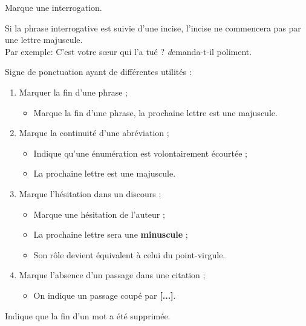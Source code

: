 \documentclass[10pt, french]{article}
\begin{document}
\begin{multicols*}{2}
\begin{definitionNOHFILLprop}
Marque une interrogation.

\begin{astuces}
Si la phrase interrogative est suivie d'une incise, l'incise ne commencera pas par une lettre majuscule.	\\

Par exemple: C'est votre sœur qui l'a tué ? \textit{d}emanda-t-il poliment.
\end{astuces}
\end{definitionNOHFILLprop}

\begin{definitionNOHFILLprop}
Signe de ponctuation ayant de différentes utilités : 
\begin{enumerate}
	\item	Marquer la fin d'une phrase ; 
		\begin{itemize}
		\item	Marque la fin d'une phrase, la prochaine lettre est une majuscule.
		\end{itemize}
	\item	Marque la continuité d'une abréviation ;
		\begin{itemize}
		\item	Indique qu'une énumération est volontairement écourtée ;
		\item	La prochaine lettre est une majuscule.
		\end{itemize}
	\item	Marque l'hésitation dans un discours ; 
		\begin{itemize}
		\item	Marque une hésitation de l'auteur ;
		\item	La prochaine lettre sera une \textbf{minuscule} ;
		\item	Son rôle devient équivalent à celui du point-virgule.
		\end{itemize}
	\item	Marque l'absence d'un passage dans une citation ;
		\begin{itemize}
		\item	On indique un passage coupé par \textbf{[...]}.
		\end{itemize}
\end{enumerate}
\end{definitionNOHFILLprop}

\begin{definitionNOHFILLprop}
Indique que la fin d'un mot a été supprimée.	\\


\end{definitionNOHFILLprop}
\end{multicols*}
\end{document}
